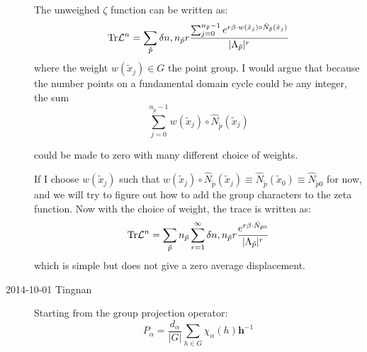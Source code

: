 \begin{description}
The unweighed $\zeta$ function can be written as:
\[
{\rm Tr}\mathcal{L}^{n}=\sum_{\tilde{p}}\delta n,n_{\tilde{p}}r\frac{\sum_{j=0}^{n_{\tilde{p}}-1}e^{r\beta\cdot w(\tilde{x}_{j})\circ\hat{N}_{\tilde{p}}(\tilde{x}_{j})}}{\vert\Lambda_{\tilde{p}}\vert^{r}}
\]
where the weight $w(\tilde{x}_{j})\in G$ the point group. I would
argue that because the number points on a fundamental domain cycle
could be any integer, the sum 
\[
\sum_{j=0}^{n_{\tilde{p}}-1}w(\tilde{x}_{j})\circ\hat{N}_{\tilde{p}}(\tilde{x}_{j})
\]


could be made to zero with many different choice of weights. 

If I choose $w(\tilde{x}_{j})$ such that $w(\tilde{x}_{j})\circ\hat{N}_{\tilde{p}}(\tilde{x}_{j})\equiv\hat{N}_{\tilde{p}}(\tilde{x}_{0})\equiv\hat{N}_{\tilde{p}0}$
for now, and we will try to figure out how to add the group characters
to the zeta function. Now with the choice of weight, the trace is
written as:
\[
{\rm Tr}\mathcal{L}^{n}=\sum_{\tilde{p}}n_{\tilde{p}}\sum_{r=1}^{\infty}\delta n,n_{\tilde{p}}r\frac{e^{r\beta\cdot\hat{N}_{\tilde{p}0}}}{\vert\Lambda_{\tilde{p}}\vert^{r}}
\]
which is simple but does not give a zero average displacement. 


\item[2014-10-01 Tingnan]

Starting from the group projection operator:
\[
P_{\alpha}=\frac{d_{\alpha}}{\vert G\vert}\sum_{h\in G}\chi_{\alpha}(h)\mathbf{h}^{-1}
\]



\end{description}
